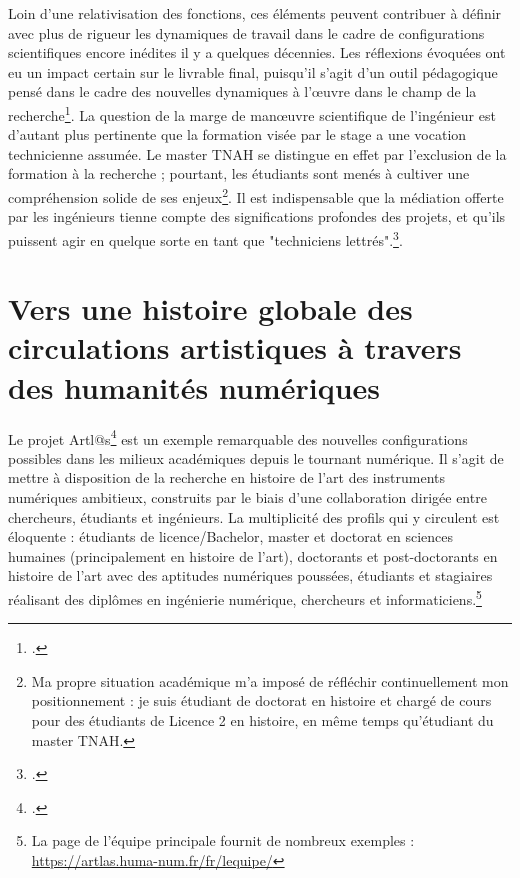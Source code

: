 \documentclass[a4paper,12pt,twoside]{book}
\begin{document}
Loin d'une relativisation des fonctions, ces éléments peuvent contribuer à définir avec plus de rigueur les dynamiques de travail dans le cadre de configurations scientifiques encore inédites il y a quelques décennies. Les réflexions évoquées ont eu un impact certain sur le livrable final, puisqu'il s'agit d'un outil pédagogique pensé dans le cadre des nouvelles dynamiques à l'œuvre dans le champ de la recherche\footcite{alloucheHumanitesNumeriquesPratiques}. La question de la marge de manœuvre scientifique de l'ingénieur est d'autant plus pertinente que la formation visée par le stage a une vocation technicienne assumée. Le master TNAH se distingue en effet par l'exclusion de la formation à la recherche ; pourtant, les étudiants sont menés à cultiver une compréhension solide de ses enjeux\footnote{Ma propre situation académique m'a imposé de réfléchir continuellement mon positionnement : je suis étudiant de doctorat en histoire et chargé de cours pour des étudiants de Licence 2 en histoire, en même temps qu'étudiant du master TNAH.}. Il est indispensable que la médiation offerte par les ingénieurs tienne compte des significations profondes des projets, et qu'ils puissent agir en quelque sorte en tant que "techniciens lettrés".\footcite{berraFaireHumanitesNumeriques2012}. 



\section*{Vers une histoire globale des circulations artistiques à travers des humanités numériques}

Le projet Artl@s\footcite{joyeux_artlas_nodate} est un exemple remarquable des nouvelles configurations possibles dans les milieux académiques depuis le tournant numérique. Il s'agit de mettre à disposition de la recherche en histoire de l'art des instruments numériques ambitieux, construits par le biais d'une collaboration dirigée entre chercheurs, étudiants et ingénieurs. La multiplicité des profils qui y circulent est éloquente : étudiants de licence/Bachelor, master et doctorat en sciences humaines (principalement en histoire de l'art), doctorants et post-doctorants en histoire de l'art avec des aptitudes numériques poussées, étudiants et stagiaires réalisant des diplômes en ingénierie numérique, chercheurs et informaticiens.\footnote{La page de l'équipe principale fournit de nombreux exemples : \url{https://artlas.huma-num.fr/fr/lequipe/}}
\end{document}
